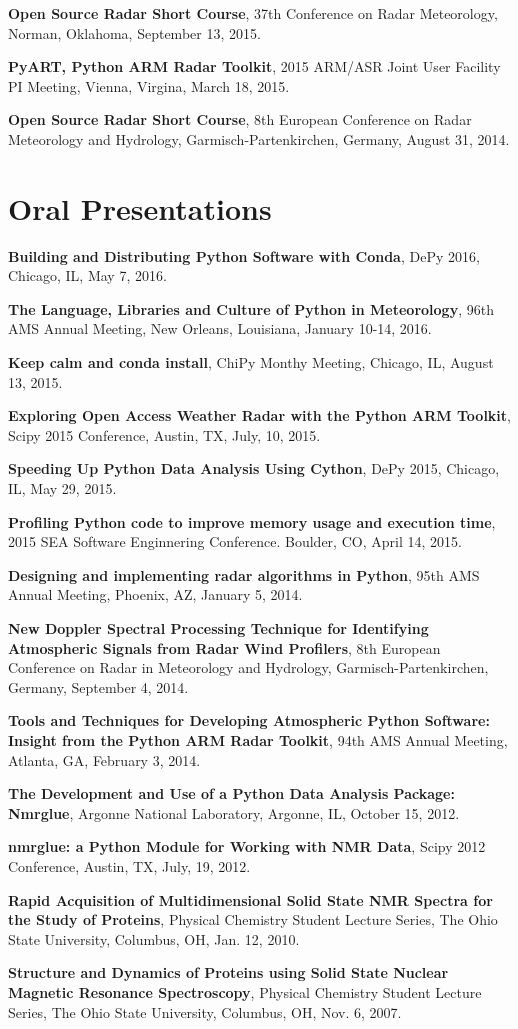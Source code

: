 \documentclass[margin,line]{res}
\begin{document}
\begin{resume}
{\bf Open Source Radar Short Course},
37th Conference on Radar Meteorology, Norman, Oklahoma, September 13, 2015.

{\bf PyART, Python ARM Radar Toolkit},
2015 ARM/ASR Joint User Facility PI Meeting, Vienna, Virgina, March 18, 2015.

{\bf Open Source Radar Short Course},
8th European Conference on Radar Meteorology and Hydrology,
Garmisch-Partenkirchen, Germany, August 31, 2014.

\section{\sc Oral Presentations}

{\bf Building and Distributing Python Software with Conda},
DePy 2016, Chicago, IL, May 7, 2016.

{\bf The Language, Libraries and Culture of Python in Meteorology},
96th AMS Annual Meeting, New Orleans, Louisiana, January 10-14, 2016.

{\bf Keep calm and conda install},
ChiPy Monthy Meeting, Chicago, IL, August 13, 2015.

{\bf Exploring Open Access Weather Radar with the Python ARM Toolkit},
Scipy 2015 Conference, Austin, TX, July, 10, 2015.

{\bf Speeding Up Python Data Analysis Using Cython},
DePy 2015, Chicago, IL, May 29, 2015.

{\bf Profiling Python code to improve memory usage and execution time},
2015 SEA Software Enginnering Conference. Boulder, CO, April 14, 2015.

{\bf Designing and implementing radar algorithms in Python},
95th AMS Annual Meeting, Phoenix, AZ, January 5, 2014.

{\bf New Doppler Spectral Processing Technique for Identifying
Atmospheric Signals from Radar Wind Profilers},
8th European Conference on Radar in Meteorology and Hydrology,
Garmisch-Partenkirchen, Germany, September 4, 2014.

{\bf Tools and Techniques for Developing Atmospheric Python Software:
Insight from the Python ARM Radar Toolkit},
94th AMS Annual Meeting, Atlanta, GA, February 3, 2014.

{\bf The Development and Use of a Python Data Analysis Package: Nmrglue},
Argonne National Laboratory, Argonne, IL, October 15, 2012.

{\bf nmrglue: a Python Module for Working with NMR Data},
Scipy 2012 Conference, Austin, TX, July, 19, 2012.

{\bf Rapid Acquisition of Multidimensional Solid State NMR Spectra for the Study of
Proteins},
Physical Chemistry Student Lecture Series, The Ohio State University, Columbus, OH, Jan. 12, 2010.

{\bf Structure and Dynamics of Proteins using Solid State Nuclear Magnetic Resonance
Spectroscopy},
Physical Chemistry Student Lecture Series, The Ohio State University, Columbus, OH, Nov. 6, 2007.

\end{resume}
\end{document}
